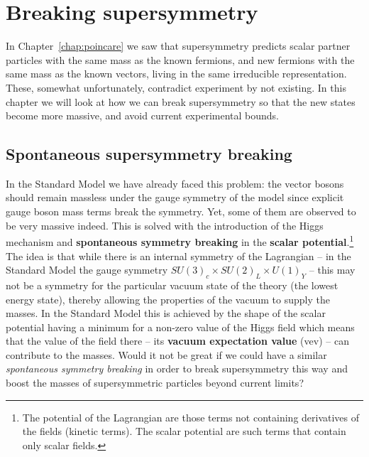 \documentclass[notes.tex]{subfiles}
\begin{document}
\chapter{Breaking supersymmetry}
\label{chap:breaking}
In Chapter~\ref{chap:poincare} we  saw that  supersymmetry predicts scalar partner particles with the same mass as the known fermions, and new fermions with the same mass as the known vectors, living in the same irreducible representation. These, somewhat unfortunately, contradict experiment by not existing. In this chapter we will look at how we can break supersymmetry so that the new states become more massive, and avoid current experimental bounds. 



\section{Spontaneous supersymmetry breaking}
\label{sec:ssb}
In the Standard Model we have already faced this problem: the vector bosons should remain massless under the gauge symmetry of the model since explicit gauge boson mass terms break the symmetry. Yet, some of them are observed to be very massive indeed. This is solved with the introduction of the Higgs mechanism and {\bf spontaneous symmetry breaking} in the {\bf scalar potential}.\footnote{The potential of the Lagrangian are those terms not containing derivatives of the fields (kinetic terms). The scalar potential are such terms that contain only scalar fields.} The idea is that while there is an internal symmetry of the Lagrangian -- in the Standard Model the gauge symmetry $SU(3)_c\times SU(2)_L\times U(1)_Y$ -- this may not be a symmetry for the particular vacuum state of the theory (the lowest energy state), thereby allowing the properties of the vacuum to supply the masses. In the Standard Model this is achieved by the shape of the scalar potential having a minimum for a non-zero value of the Higgs field which means that the value of the field there -- its {\bf vacuum expectation value} (vev) -- can contribute to the masses. Would it not be great if we could have a similar {\it spontaneous symmetry breaking} in order to break supersymmetry this way and boost the masses of supersymmetric particles beyond current limits?
\end{document}
